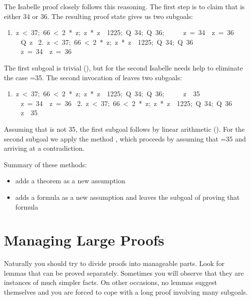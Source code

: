 The Isabelle proof closely follows this reasoning. The first 
step is to claim that  is either 34 or 36. The resulting proof 
state gives us two subgoals: 
\begin{isabelle}
\ 1.\ \isasymlbrakk z\ <\ 37;\ 66\ <\ 2\ *\ z;\ z\ *\ z\ \isasymnoteq\ 1225;\ Q\ 34;\ Q\ 36;\isanewline
\ \ \ \ \ z\ =\ 34\ \isasymor\ z\ =\ 36\isasymrbrakk\isanewline
\ \ \ \ \isasymLongrightarrow\ Q\ z\isanewline
\ 2.\ \isasymlbrakk z\ <\ 37;\ 66\ <\ 2\ *\ z;\ z\ *\ z\ \isasymnoteq\ 1225;\ Q\ 34;\ Q\ 36\isasymrbrakk\isanewline
\ \ \ \ \isasymLongrightarrow\ z\ =\ 34\ \isasymor\ z\ =\ 36
\end{isabelle}
The first subgoal is trivial (), but for the second Isabelle needs help to eliminate
the case
=35.  The second invocation  of {} leaves two
subgoals: 
\begin{isabelle}
\ 1.\ \isasymlbrakk z\ <\ 37;\ 66\ <\ 2\ *\ z;\ z\ *\ z\ \isasymnoteq\
1225;\ Q\ 34;\ Q\ 36;\isanewline
\ \ \ \ \ z\ \isasymnoteq\ 35\isasymrbrakk\isanewline
\ \ \ \ \isasymLongrightarrow\ z\ =\ 34\ \isasymor\ z\ =\ 36\isanewline
\ 2.\ \isasymlbrakk z\ <\ 37;\ 66\ <\ 2\ *\ z;\ z\ *\ z\ \isasymnoteq\ 1225;\ Q\ 34;\ Q\ 36\isasymrbrakk\isanewline
\ \ \ \ \isasymLongrightarrow\ z\ \isasymnoteq\ 35
\end{isabelle}

Assuming that  is not 35, the first subgoal follows by linear arithmetic
(\isa{arith}). For the second subgoal we apply the method \isa{force}, 
which proceeds by assuming that \isa{z}=35 and arriving at a contradiction.


\medskip
Summary of these methods:
\begin{itemize}
\item {} adds a theorem as a new assumption
\item {} adds a formula as a new assumption and leaves the
subgoal of proving that formula
\end{itemize}


\section{Managing Large Proofs}

Naturally you should try to divide proofs into manageable parts.  Look for lemmas
that can be proved separately.  Sometimes you will observe that they are
instances of much simpler facts.  On other occasions, no lemmas suggest themselves
and you are forced to cope with a long proof involving many subgoals.  

